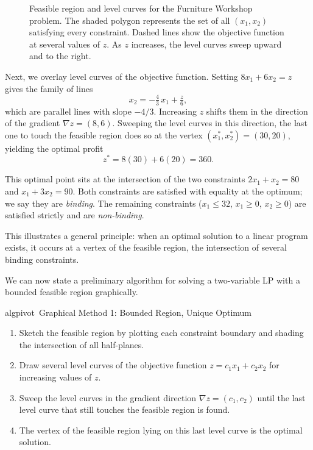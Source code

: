 \begin{solution}
\begin{figure}[H]
\caption{Feasible region and level curves for the Furniture Workshop problem. The shaded polygon represents the set of all $(x_1,x_2)$ satisfying every constraint. Dashed lines show the objective function at several values of $z$. As $z$ increases, the level curves sweep upward and to the right.}
\label{fig:FurnitureWorkshopFeasibleRegion}
\end{figure}

Next, we overlay level curves of the objective function. Setting $8x_1 + 6x_2 = z$ gives the family of lines
\[
x_2 = -\tfrac{4}{3}\,x_1 + \tfrac{z}{6},
\]
which are parallel lines with slope $-4/3$. Increasing $z$ shifts them in the direction of the gradient $\nabla z = (8,6)$.  Sweeping the level curves in this direction, the last one to touch the feasible region does so at the vertex $(x_1^*,x_2^*) = (30,20)$, yielding the optimal profit
\[
z^* = 8(30) + 6(20) = 360.
\]

This optimal point sits at the intersection of the two constraints $2x_1+x_2=80$ and $x_1+3x_2=90$. Both constraints are satisfied with equality at the optimum; we say they are \textit{binding}. The remaining constraints ($x_1\leq 32$, $x_1\geq 0$, $x_2\geq 0$) are satisfied strictly and are \textit{non-binding}.

This illustrates a general principle: when an optimal solution to a linear program exists, it occurs at a vertex of the feasible region, the intersection of several binding constraints.
\end{solution}

We can now state a preliminary algorithm for solving a two-variable LP with a bounded feasible region graphically.
\begin{stepbox}{algpivot}{\ Graphical Method 1: Bounded Region, Unique Optimum}
\begin{enumerate}[nosep]
\item Sketch the feasible region by plotting each constraint boundary and shading the intersection of all half-planes.
\item Draw several level curves of the objective function $z = c_1 x_1 + c_2 x_2$ for increasing values of $z$.
\item Sweep the level curves in the gradient direction $\nabla z = (c_1, c_2)$ until the last level curve that still touches the feasible region is found.
\item The vertex of the feasible region lying on this last level curve is the optimal solution.
\end{enumerate}
\end{stepbox}

